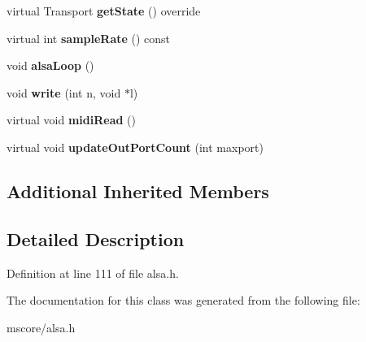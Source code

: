\begin{DoxyCompactItemize}
virtual Transport {\bfseries get\+State} () override
\item 
\mbox{\label{class_ms_1_1_alsa_audio_af40b821966550d9fa094554462d1b46d}} 
virtual int {\bfseries sample\+Rate} () const
\item 
\mbox{\label{class_ms_1_1_alsa_audio_a77ba11d238e4d86e2f72fb3c3ac29d4f}} 
void {\bfseries alsa\+Loop} ()
\item 
\mbox{\label{class_ms_1_1_alsa_audio_af86da8ddae221a66f4e1e03d5fe68b97}} 
void {\bfseries write} (int n, void $\ast$l)
\item 
\mbox{\label{class_ms_1_1_alsa_audio_a3ad8a226a37b50838184f95afef17bcf}} 
virtual void {\bfseries midi\+Read} ()
\item 
\mbox{\label{class_ms_1_1_alsa_audio_a8735b2382b8d43dd56dc94272fb7e2cf}} 
virtual void {\bfseries update\+Out\+Port\+Count} (int maxport)
\end{DoxyCompactItemize}
\subsection*{Additional Inherited Members}


\subsection{Detailed Description}


Definition at line 111 of file alsa.\+h.



The documentation for this class was generated from the following file\+:\begin{DoxyCompactItemize}
\item 
mscore/alsa.\+h\end{DoxyCompactItemize}
